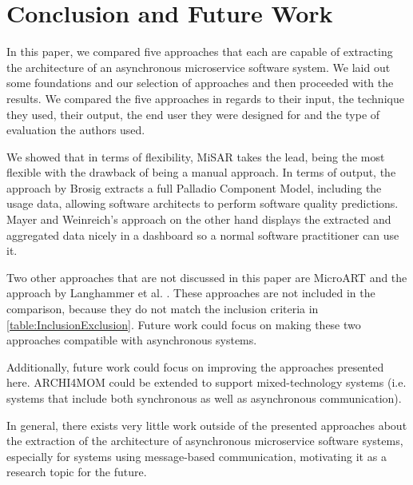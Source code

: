 
\section{Conclusion and Future Work}
\label{cha:Conclusion}
In this paper, we compared five approaches that each are capable of extracting the architecture of an asynchronous microservice software system.
We laid out some foundations and our selection of approaches and then proceeded with the results.
We compared the five approaches in regards to their input, the technique they used, their output, the end user they were designed for and the type of evaluation the authors used.

We showed that in terms of flexibility, MiSAR \cite{Alshuqayran2018MiSAR} takes the lead, being the most flexible with the drawback of being a manual approach.
In terms of output, the approach by Brosig \cite{Brosig2011} extracts a full Palladio Component Model, including the usage data, allowing software architects to perform software quality predictions.
Mayer and Weinreich's approach \cite{Mayer2018} on the other hand displays the extracted and aggregated data nicely in a dashboard so a normal software practitioner can use it.

Two other approaches that are not discussed in this paper are MicroART \cite{Granchelli2017MicroART} and the approach by Langhammer et al. \cite{Langhammer2016}.
These approaches are not included in the comparison, because they do not match the inclusion criteria in \autoref{table:InclusionExclusion}.
Future work could focus on making these two approaches compatible with asynchronous systems.

Additionally, future work could focus on improving the approaches presented here.
ARCHI4MOM could be extended to support mixed-technology systems (i.e. systems that include both synchronous as well as asynchronous communication).

In general, there exists very little work outside of the presented approaches about the extraction of the architecture of asynchronous microservice software systems, especially for systems using message-based communication, motivating it as a research topic for the future. 